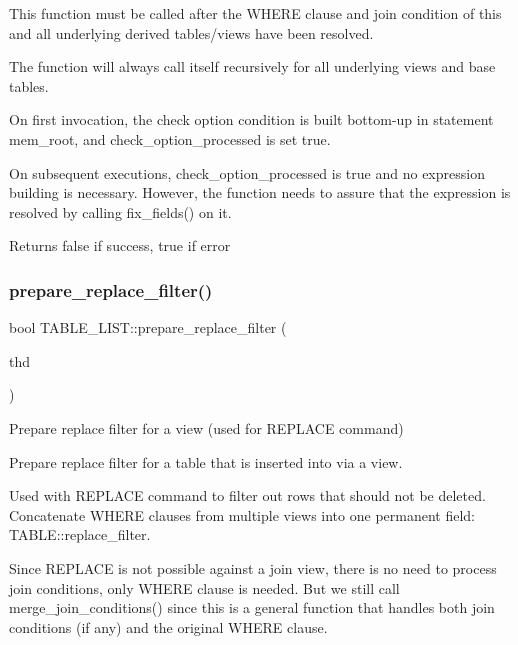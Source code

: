 This function must be called after the W\+H\+E\+RE clause and join condition of this and all underlying derived tables/views have been resolved.

The function will always call itself recursively for all underlying views and base tables.

On first invocation, the check option condition is built bottom-\/up in statement mem\+\_\+root, and check\+\_\+option\+\_\+processed is set true.

On subsequent executions, check\+\_\+option\+\_\+processed is true and no expression building is necessary. However, the function needs to assure that the expression is resolved by calling fix\+\_\+fields() on it.

\begin{DoxyReturn}{Returns}
false if success, true if error 
\end{DoxyReturn}
\mbox{\label{structTABLE__LIST_ac7e6f3073efcb58bd1fff1a81c3d15c8}} 
\subsubsection{\texorpdfstring{prepare\+\_\+replace\+\_\+filter()}{prepare\_replace\_filter()}}
{\footnotesize\ttfamily bool T\+A\+B\+L\+E\+\_\+\+L\+I\+S\+T\+::prepare\+\_\+replace\+\_\+filter (\begin{DoxyParamCaption}\item[{T\+HD $\ast$}]{thd }\end{DoxyParamCaption})}



Prepare replace filter for a view (used for R\+E\+P\+L\+A\+CE command) 

Prepare replace filter for a table that is inserted into via a view.

Used with R\+E\+P\+L\+A\+CE command to filter out rows that should not be deleted. Concatenate W\+H\+E\+RE clauses from multiple views into one permanent field\+: T\+A\+B\+L\+E\+::replace\+\_\+filter.

Since R\+E\+P\+L\+A\+CE is not possible against a join view, there is no need to process join conditions, only W\+H\+E\+RE clause is needed. But we still call merge\+\_\+join\+\_\+conditions() since this is a general function that handles both join conditions (if any) and the original W\+H\+E\+RE clause.


